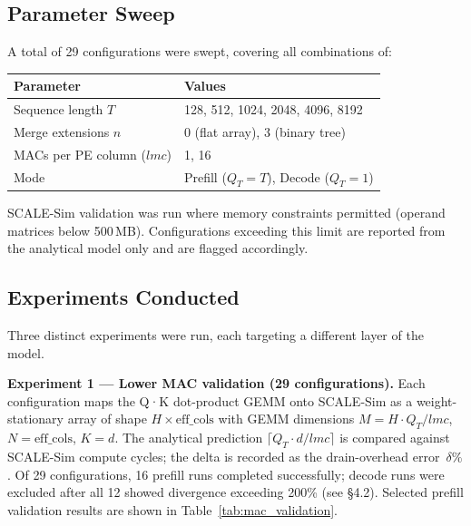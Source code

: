 \documentclass[11pt]{article}
\begin{document}
\subsection{Parameter Sweep}

A total of 29 configurations were swept, covering all
combinations of:

\begin{center}
\begin{tabular}{ll}
\toprule
Parameter & Values \\
\midrule
Sequence length \(T\) & 128, 512, 1024, 2048, 4096, 8192 \\
Merge extensions \(n\) & 0 (flat array), 3 (binary tree) \\
MACs per PE column (\(lmc\)) & 1, 16 \\
Mode & Prefill (\(Q_T = T\)), Decode (\(Q_T = 1\)) \\
\bottomrule
\end{tabular}
\end{center}

SCALE-Sim validation was run where memory constraints
permitted (operand matrices below 500\,MB).
Configurations exceeding this limit are reported from the
analytical model only and are flagged accordingly.

\subsection{Experiments Conducted}

Three distinct experiments were run, each targeting a different
layer of the model.

\textbf{Experiment 1 --- Lower MAC validation (29 configurations).}
Each configuration maps the Q·K dot-product GEMM onto SCALE-Sim
as a weight-stationary array of shape \(H \times \text{eff\_cols}\)
with GEMM dimensions \(M = H \cdot Q_T / lmc\), \(N = \text{eff\_cols}\),
\(K = d\).
The analytical prediction \(\lceil Q_T \cdot d / lmc \rceil\) is
compared against SCALE-Sim compute cycles;
the delta is recorded as the drain-overhead error~\(\delta\%\).
Of 29 configurations, 16 prefill runs completed successfully;
decode runs were excluded after all 12 showed divergence exceeding
200\% (see \S4.2).
Selected prefill validation results are shown in
Table~\ref{tab:mac_validation}.
\end{document}
